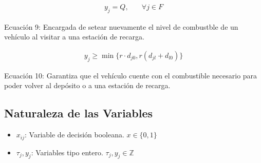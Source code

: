 \documentclass[letter, 10pt]{article}
\begin{document}
\begin{align}
    y_j = Q, & \quad \forall j \in F
\end{align}

\begin{center}
    Ecuación 9: Encargada de setear nuevamente el nivel de combustble de un vehículo al visitar a una estación de recarga.
\end{center}

\begin{align}
    y_j \geq \min \{r \cdot d_{j0}, r(d_{jl} + d_{l0})\}
\end{align}

\begin{center}
    Ecuación 10: Garantiza que el vehículo cuente con el combustible necesario para poder volver al depósito o a una estación de recarga.
\end{center}

\subsection{Naturaleza de las Variables}
\begin{itemize}
    \item $x_{ij}$: Variable de decisión booleana. $x \in \{0,1\}$
    \item $\tau_j, y_j$: Variables tipo entero. $\tau_j, y_j \in \mathbb{Z}$
\end{itemize}


\end{document}
